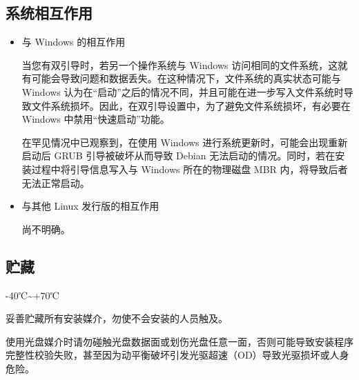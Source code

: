 \documentclass{article}
\begin{document}
\begin{multicols*}{3}





	\begin{tcolorbox}
	\section*{系统相互作用}
	\end{tcolorbox}
	\begin{itemize}[leftmargin=*]
		\setlength{\parindent}{0pt}

		\item 与 Windows 的相互作用

		当您有双引导时，若另一个操作系统与 Windows 访问相同的文件系统，这就有可能会导致问题和数据丢失。在这种情况下，文件系统的真实状态可能与 Windows 认为在“启动”之后的情况不同，并且可能在进一步写入文件系统时导致文件系统损坏。因此，在双引导设置中，为了避免文件系统损坏，有必要在 Windows 中禁用“快速启动”功能。

		在罕见情况中已观察到，在使用 Windows 进行系统更新时，可能会出现重新启动后 GRUB 引导被破坏从而导致 Debian 无法启动的情况。同时，若在安装过程中将引导信息写入与 Windows 所在的物理磁盘 MBR 内，将导致后者无法正常启动。

		\item 与其他 Linux 发行版的相互作用

		尚不明确。

	\end{itemize}


	\begin{tcolorbox}
	\section*{贮藏}
	\end{tcolorbox}

	-40℃\textasciitilde +70℃

	妥善贮藏所有安装媒介，勿使不会安装的人员触及。

	使用光盘媒介时请勿碰触光盘数据面或划伤光盘任意一面，否则可能导致安装程序完整性校验失败，甚至因为动平衡破坏引发光驱超速（OD）导致光驱损坏或人身危险。


\end{multicols*}
\end{document}

